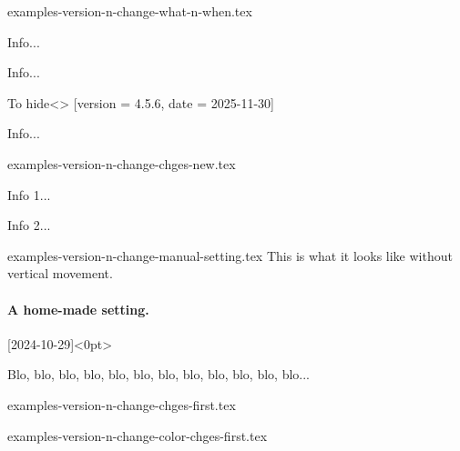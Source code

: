 \begin{filecontents*}[overwrite]{examples-version-n-change-what-n-when.tex}
\begin{tdoctech}[date      = 2024-10-29,
                 col-chges = red]
    \item Info...
\end{tdoctech}

\begin{tdocupdate}[version   = 1.2.3,
                   col-chges = ForestGreen,
                   col       = ForestGreen]
    \item Info...
\end{tdocupdate}

\begin{tdoctopic}{To hide}<\faEyeSlash>%
                 [version = 4.5.6,
                  date    = 2025-11-30]
    \item Info...
\end{tdoctopic}
\end{filecontents*}


\begin{filecontents*}[overwrite]{examples-version-n-change-chges-new.tex}
\begin{tdocnew}
    \item Info 1...
    \item Info 2...
\end{tdocnew}
\end{filecontents*}


\begin{filecontents*}[overwrite]{examples-version-n-change-manual-setting.tex}
This is what it looks like without vertical movement.

\paragraph{A home-made setting.}%
[2024-10-29]<0pt>

Blo, blo, blo, blo, blo, blo, blo, blo, blo, blo, blo, blo...
\end{filecontents*}


\begin{filecontents*}[overwrite]{examples-version-n-change-chges-first.tex}
\end{filecontents*}


\begin{filecontents*}[overwrite]{examples-version-n-change-color-chges-first.tex}
\end{filecontents*}


